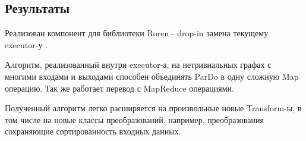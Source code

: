 \subsection{Результаты}

Реализован компонент для библиотеки Roren - drop-in замена текущему executor-у \cite{prod}.

Алгоритм, реализованный внутри executor-а, на нетривиальных графах с многими входами и выходами способен объединять ParDo в одну сложную Map операцию. Так же работает перевод с MapReduce операциями.

Полученный алгоритм легко расширяется на произвольные новые Transform-ы, в том числе на новые классы преобразований, например, преобразования сохраняющие сортированность входных данных.
